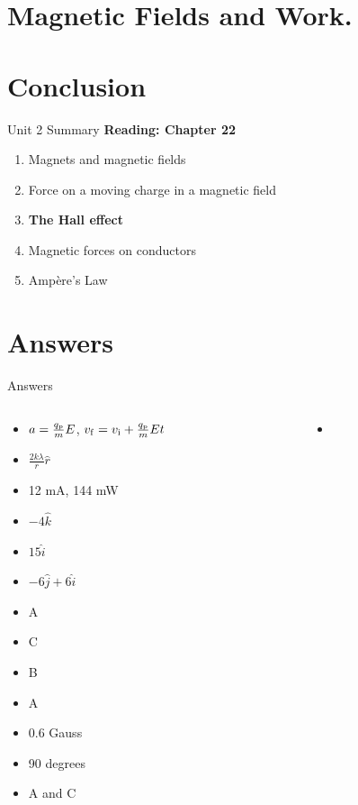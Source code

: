 \documentclass{beamer}
\begin{document}
\section{Magnetic Fields and Work.}

\section{Conclusion}

\begin{frame}{Unit 2 Summary}
\textbf{Reading: Chapter 22}
\begin{enumerate}
\item Magnets and magnetic fields
\item Force on a moving charge in a magnetic field
\item \textbf{The Hall effect}
\item Magnetic forces on conductors
\item \alert{Amp\`{e}re's Law}
\end{enumerate}
\end{frame}

\section{Answers}

\begin{frame}{Answers}
\tiny
\begin{columns}[T]
\begin{column}{0.5\textwidth}
\begin{itemize}
\item $a = \frac{q_{\rm p}}{m} E$, $v_{\rm f}=v_{\rm i}+\frac{q_{\rm p}}{m} E t$
\item $\frac{2k\lambda}{r} \hat{r}$
\item 12 mA, 144 mW
\item $-4 \hat{k}$
\item $15 \hat{i}$
\item $-6 \hat{j}+6\hat{i}$
\item A
\item C
\item B
\item A
\item 0.6 Gauss
\item 90 degrees
\item A and C
\end{itemize}
\end{column}
\begin{column}{0.5\textwidth}
\begin{itemize}
\item 
\end{itemize}
\end{column}
\end{columns}
\end{frame}
\end{document}

